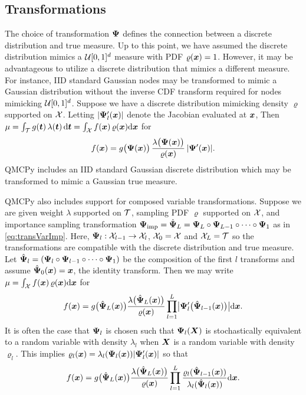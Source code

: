 \documentclass[graybox,footinfo]{svmult}
\newcommand{\IMP}{\textup{imp}}
\begin{document}
\subsection{Transformations}

The choice of transformation ${\boldsymbol{\Psi}}$ defines the connection between a discrete distribution and true measure. Up to this point, we have assumed the discrete distribution mimics a ${\mathcal{U}}[0,1]^d$ measure with PDF $\varrho({\boldsymbol{x}})=1$. However, it may be advantageous to utilize a discrete distribution that mimics a different measure. For instance, IID standard Gaussian nodes may be transformed to mimic a Gaussian distribution without the inverse CDF transform required for nodes mimicking ${\mathcal{U}}[0,1]^d$. Suppose we have a discrete distribution mimicking  density $\varrho$ supported on ${\mathcal{X}}$. Letting $\lvert {\boldsymbol{\Psi}}_l'({\boldsymbol{x}}) \rvert$ denote the Jacobian evaluated at ${\boldsymbol{x}}$, Then $\mu = \int_{\mathcal{T}} g({\boldsymbol{t}}) \, \lambda({\boldsymbol{t}}) \, \mathrm{d} {\boldsymbol{t}}  =  \int_{{\mathcal{X}}}f({\boldsymbol{x}}) \, \varrho({\boldsymbol{x}}) \mathrm{d} {\boldsymbol{x}}$ for 
\begin{equation*}
   f({\boldsymbol{x}})  = g\bigl({\boldsymbol{\Psi}}({\boldsymbol{x}})\bigr)  \, \frac{\lambda\bigl({\boldsymbol{\Psi}}({\boldsymbol{x}})\bigr)}{\varrho({\boldsymbol{x}})} \, \lvert {\boldsymbol{\Psi}}'({\boldsymbol{x}})\rvert.
\end{equation*}
QMCPy includes an IID standard Gaussian discrete distribution which may be transformed to mimic a Gaussian true measure.

QMCPy also includes support for composed variable transformations. Suppose we are given weight $\lambda$ supported on ${\mathcal{T}}$, sampling PDF $\varrho$ supported on  ${\mathcal{X}}$, and importance sampling transformation $\bsPsi_\IMP=\hat{\bsPsi}_L = \bsPsi_L \circ \bsPsi_{L-1} \circ \dots \circ \bsPsi_1$ as in \eqref{eq:transVarImp}. Here, ${\boldsymbol{\Psi}}_l:{\mathcal{X}}_{l-1} \to {\mathcal{X}}_l$,  ${\mathcal{X}}_0={\mathcal{X}}$ and ${\mathcal{X}}_L={\mathcal{T}}$ so the transformations are compatible with the discrete distribution and true measure. Let $\hat{{\boldsymbol{\Psi}}}_l=({\boldsymbol{\Psi}}_l \circ {\boldsymbol{\Psi}}_{l-1} \circ \dots \circ {\boldsymbol{\Psi}}_1)$ be the composition of the first $l$ transforms and assume $\hat{{\boldsymbol{\Psi}}}_0({\boldsymbol{x}})={\boldsymbol{x}}$, the identity transform. Then we may write $\mu =  \int_{{\mathcal{X}}}f({\boldsymbol{x}}) \, \varrho({\boldsymbol{x}}) \mathrm{d} {\boldsymbol{x}}$ for 
\begin{equation*}
    f({\boldsymbol{x}}) 
 = g\bigl(\hat{{\boldsymbol{\Psi}}}_L({\boldsymbol{x}})\bigr)\frac{\lambda\bigl(\hat{{\boldsymbol{\Psi}}}_L({\boldsymbol{x}})\bigr)}{\varrho({\boldsymbol{x}})}\prod_{l=1}^L \bigl\lvert {\boldsymbol{\Psi}}_l'\bigl(\hat{{\boldsymbol{\Psi}}}_{l-1}({\boldsymbol{x}})\bigr) \bigr\rvert \mathrm{d} {\boldsymbol{x}} .
\end{equation*}
It is often the case that ${\boldsymbol{\Psi}}_l$ is chosen such that ${\boldsymbol{\Psi}}_l({\boldsymbol{X}})$ is stochastically equivalent to a random variable with density $\lambda_l$ when ${\boldsymbol{X}}$ is a random variable with density $\varrho_l$.  This implies  $\varrho_l({\boldsymbol{x}}) = \lambda_l({\boldsymbol{\Psi}}_l({\boldsymbol{x}}))\lvert  {\boldsymbol{\Psi}}'_l ({\boldsymbol{x}}) \rvert$ so that
\begin{equation*}
f({\boldsymbol{x}}) 
 = g\bigl(\hat{{\boldsymbol{\Psi}}}_L({\boldsymbol{x}})\bigr)\frac{\lambda\bigl(\hat{{\boldsymbol{\Psi}}}_L({\boldsymbol{x}})\bigr)}{\varrho({\boldsymbol{x}})}\prod_{l=1}^L \frac{\varrho_l(\hat{{\boldsymbol{\Psi}}}_{l-1}({\boldsymbol{x}}))}{\lambda_l(\hat{{\boldsymbol{\Psi}}}_l({\boldsymbol{x}}))} \mathrm{d} {\boldsymbol{x}}.
\end{equation*}
\end{document}
